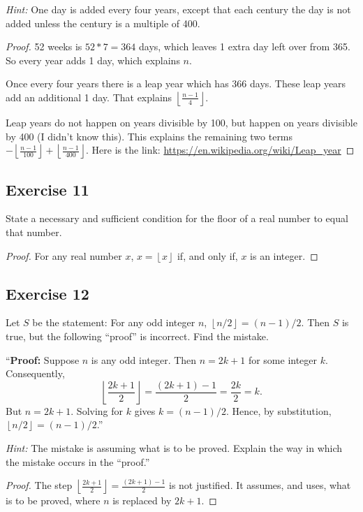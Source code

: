 \documentclass[14pt]{extarticle}
\newcommand{\floor}[1]{{\left\lfloor#1\right\rfloor}}
\begin{document}
{\it Hint:} One day is added every four years, except that each century the day is not added unless the century is a multiple of 400.

\begin{proof}
52 weeks is $52 * 7 = 364$ days, which leaves 1 extra day left over from 365. So every year adds 1 day, which explains $n$.

Once every four years there is a leap year which has 366 days. These leap years add an additional 1 day. That explains $\floor{\frac{n-1}{4}}$.

Leap years do not happen on years divisible by 100, but happen on years divisible by 400 (I didn't know this). This explains the remaining two terms $-\floor{\frac{n-1}{100}} + \floor{\frac{n-1}{400}}$. Here is the link: \url{https://en.wikipedia.org/wiki/Leap_year}
\end{proof}

\subsection{Exercise 11}
State a necessary and sufficient condition for the floor of a real number to equal that number.

\begin{proof}
For any real number $x$, $x = \floor{x}$ if, and only if, $x$ is an integer.
\end{proof}

\subsection{Exercise 12}
Let $S$ be the statement: For any odd integer $n$, $\floor{n/2} = (n - 1)/2$. Then $S$ is true, but the following “proof” is incorrect. Find the mistake. 

“{\bf Proof:} Suppose $n$ is any odd integer. Then $n = 2k + 1$ for some integer $k$. Consequently,
\[
\floor{\frac{2k+1}{2}} = \frac{(2k+1)-1}{2} = \frac{2k}{2} = k.
\]
But $n = 2k + 1$. Solving for $k$ gives $k = (n - 1)/2$.
Hence, by substitution, $\floor{n/2} = (n - 1)/2$.”

{\it Hint:} The mistake is assuming what is to be proved. Explain the way in which the mistake occurs in the “proof.”

\begin{proof}
The step $\floor{\frac{2k+1}{2}} = \frac{(2k+1)-1}{2}$ is not justified. It assumes, and uses, what is to be proved, where $n$ is replaced by $2k+1$.
\end{proof}
\end{document}
